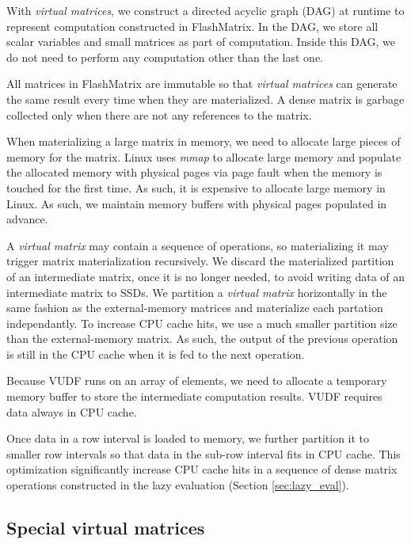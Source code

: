 With \textit{virtual matrices}, we construct a directed acyclic graph (DAG)
at runtime to represent computation constructed in FlashMatrix. In the DAG, we
store all scalar variables and small matrices as part of computation. Inside
this DAG, we do not need to perform any computation other than the last one.

All matrices in FlashMatrix are immutable so that \textit{virtual matrices}
can generate the same result every time when they are materialized.
A dense matrix is garbage collected only when there are not any references to
the matrix.

When materializing a large matrix in memory, we need to allocate large pieces
of memory for the matrix. Linux uses \textit{mmap} to allocate large memory
and populate the allocated memory with physical pages via page fault when
the memory is touched for the first time. As such, it is expensive to allocate
large memory in Linux. As such, we maintain memory buffers with physical pages
populated in advance.

A \textit{virtual matrix} may contain a sequence of operations, so materializing
it may trigger matrix materialization recursively. We discard the materialized
partition of an intermediate matrix, once it is no longer needed, to avoid
writing data of an intermediate matrix to SSDs.
We partition a \textit{virtual matrix} horizontally in the same fashion as
the external-memory matrices and materialize each partation independantly. 
To increase CPU cache hits, we use a much smaller partition size than
the external-memory matrix. As such, the output of the previous operation is
still in the CPU cache when it is fed to the next operation.

Because VUDF runs on an array of elements, we need to allocate a temporary
memory buffer to store the intermediate computation results.
VUDF requires data always in CPU cache.

Once data in a row interval is loaded to memory, we further partition it to
smaller row intervals so that data
in the sub-row interval fits in CPU cache.  This optimization significantly
increase CPU cache hits in a sequence of dense matrix operations constructed in
the lazy evaluation (Section \ref{sec:lazy_eval}).


\subsection{Special virtual matrices}

